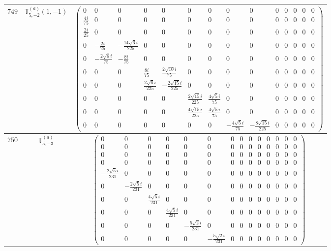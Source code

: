 \documentclass[fleqn,8pt,landscape]{jsarticle}
\begin{document}
\begin{center}
\begin{longtable}{ccc}
$ 749 $ & $ \mathbb{T}_{5,-2}^{(a)}(1,-1) $ & $ \begin{pmatrix} 0 & 0 & 0 & 0 & 0 & 0 & 0 & 0 & 0 & 0 & 0 & 0 & 0 & 0 \\ \frac{4 i}{75} & 0 & 0 & 0 & 0 & 0 & 0 & 0 & 0 & 0 & 0 & 0 & 0 & 0 \\ \frac{2 i}{25} & 0 & 0 & 0 & 0 & 0 & 0 & 0 & 0 & 0 & 0 & 0 & 0 & 0 \\ 0 & - \frac{2 i}{25} & - \frac{14 \sqrt{6} i}{225} & 0 & 0 & 0 & 0 & 0 & 0 & 0 & 0 & 0 & 0 & 0 \\ 0 & - \frac{2 \sqrt{6} i}{75} & - \frac{8 i}{75} & 0 & 0 & 0 & 0 & 0 & 0 & 0 & 0 & 0 & 0 & 0 \\ 0 & 0 & 0 & \frac{8 i}{75} & \frac{2 \sqrt{10} i}{75} & 0 & 0 & 0 & 0 & 0 & 0 & 0 & 0 & 0 \\ 0 & 0 & 0 & \frac{2 \sqrt{6} i}{225} & - \frac{2 \sqrt{15} i}{225} & 0 & 0 & 0 & 0 & 0 & 0 & 0 & 0 & 0 \\ 0 & 0 & 0 & 0 & 0 & \frac{2 \sqrt{15} i}{225} & \frac{4 \sqrt{5} i}{75} & 0 & 0 & 0 & 0 & 0 & 0 & 0 \\ 0 & 0 & 0 & 0 & 0 & \frac{4 \sqrt{15} i}{225} & \frac{4 \sqrt{5} i}{75} & 0 & 0 & 0 & 0 & 0 & 0 & 0 \\ 0 & 0 & 0 & 0 & 0 & 0 & 0 & - \frac{4 \sqrt{5} i}{75} & - \frac{8 \sqrt{15} i}{225} & 0 & 0 & 0 & 0 & 0 \end{pmatrix} $ \\ \hline
$ 750 $ & $ \mathbb{T}_{5,-3}^{(a)} $ & $ \begin{pmatrix} 0 & 0 & 0 & 0 & 0 & 0 & 0 & 0 & 0 & 0 & 0 & 0 & 0 & 0 \\ 0 & 0 & 0 & 0 & 0 & 0 & 0 & 0 & 0 & 0 & 0 & 0 & 0 & 0 \\ 0 & 0 & 0 & 0 & 0 & 0 & 0 & 0 & 0 & 0 & 0 & 0 & 0 & 0 \\ 0 & 0 & 0 & 0 & 0 & 0 & 0 & 0 & 0 & 0 & 0 & 0 & 0 & 0 \\ - \frac{2 \sqrt{5} i}{231} & 0 & 0 & 0 & 0 & 0 & 0 & 0 & 0 & 0 & 0 & 0 & 0 & 0 \\ 0 & - \frac{2 \sqrt{5} i}{231} & 0 & 0 & 0 & 0 & 0 & 0 & 0 & 0 & 0 & 0 & 0 & 0 \\ 0 & 0 & \frac{4 \sqrt{5} i}{231} & 0 & 0 & 0 & 0 & 0 & 0 & 0 & 0 & 0 & 0 & 0 \\ 0 & 0 & 0 & \frac{4 \sqrt{5} i}{231} & 0 & 0 & 0 & 0 & 0 & 0 & 0 & 0 & 0 & 0 \\ 0 & 0 & 0 & 0 & - \frac{5 \sqrt{2} i}{231} & 0 & 0 & 0 & 0 & 0 & 0 & 0 & 0 & 0 \\ 0 & 0 & 0 & 0 & 0 & - \frac{5 \sqrt{2} i}{231} & 0 & 0 & 0 & 0 & 0 & 0 & 0 & 0 \end{pmatrix} $ \\ \hline

\end{longtable}
\end{center}
\end{document}
